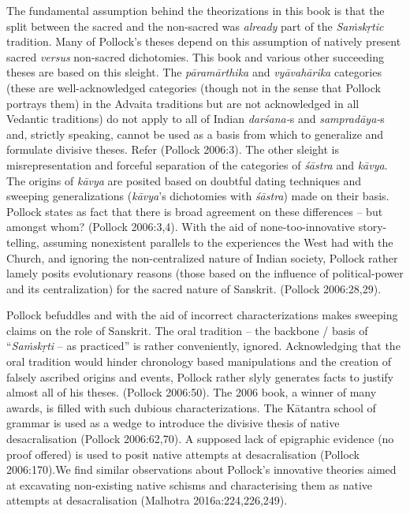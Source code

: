 The fundamental assumption behind the theorizations in this book is that the split between the sacred and the non-sacred was \textit{already} part of the \textit{Saṁskṛtic} tradition. Many of Pollock's theses depend on this assumption of natively present sacred \textit{versus} non-sacred dichotomies. This book and various other succeeding theses are based on this sleight. The \textit{pāramārthika} and \textit{vyāvahārika} categories (these are well-acknowledged categories (though not in the sense that Pollock portrays them) in the Advaita traditions but are not acknowledged in all Vedantic traditions) do not apply to all of Indian \textit{darśana-}s and \textit{sampradāya-}s and, strictly speaking, cannot be used as a basis from which to generalize and formulate divisive theses. Refer (Pollock 2006:3). The other sleight is misrepresentation and forceful separation of the categories of \textit{śāstra} and \textit{kāvya}. The origins of \textit{kāvya} are posited based on doubtful dating techniques and sweeping generalizations (\textit{kāvya}'s dichotomies with \textit{śāstra}) made on their basis. Pollock states as fact that there is broad agreement on these differences – but amongst whom? (Pollock 2006:3,4). With the aid of none-too-innovative story-telling, assuming nonexistent parallels to the experiences the West had with the Church, and ignoring the non-centralized nature of Indian society, Pollock rather lamely posits evolutionary reasons (those based on the influence of political-power and its centralization) for the sacred nature of Sanskrit. (Pollock 2006:28,29).

Pollock befuddles and with the aid of incorrect characterizations makes sweeping claims on the role of Sanskrit. The oral tradition – the backbone / basis of “\textit{Saṁskṛti} – as practiced” is rather conveniently, ignored. Acknowledging that the oral tradition would hinder chronology based manipulations and the creation of falsely ascribed origins and events, Pollock rather slyly generates facts to justify almost all of his theses. (Pollock 2006:50). The 2006 book, a winner of many awards, is filled with such dubious characterizations. The Kātantra school of grammar is used as a wedge to introduce the divisive thesis of native desacralisation (Pollock 2006:62,70). A supposed lack of epigraphic evidence (no proof offered) is used to posit native attempts at desacralisation (Pollock 2006:170).We find similar observations about Pollock's innovative theories aimed at excavating non-existing native schisms and characterising them as native attempts at desacralisation (Malhotra 2016a:224,226,249).


